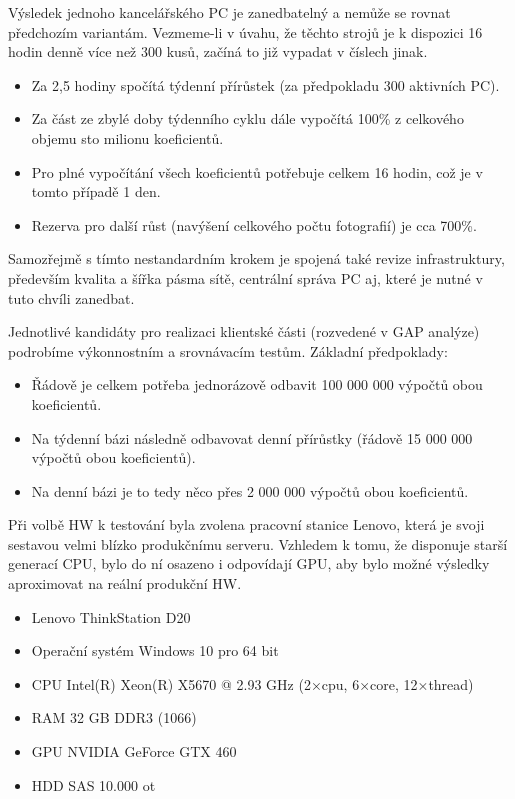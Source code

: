 Výsledek jednoho kancelářského PC je zanedbatelný a nemůže se rovnat předchozím variantám. Vezmeme-li v úvahu, že těchto strojů je k dispozici 16 hodin denně více než 300 kusů, začíná to již vypadat v číslech jinak.

\begin{itemize}
	\setlength{\parskip}{0pt}
	\setlength{\itemsep}{0pt}
	\item {Za 2,5 hodiny spočítá týdenní přírůstek (za předpokladu 300 aktivních PC).}
	\item {Za část ze zbylé doby týdenního cyklu dále vypočítá 100\% z celkového objemu sto milionu koeficientů.}
	\item {Pro plné vypočítání všech koeficientů potřebuje celkem 16 hodin, což je v tomto případě 1 den.}
	\item {Rezerva pro další růst (navýšení celkového počtu fotografií) je cca 700\%.}
\end{itemize}

Samozřejmě s tímto nestandardním krokem je spojená také revize infrastruktury, především kvalita a šířka pásma sítě, centrální správa PC aj, které je nutné v tuto chvíli zanedbat.

Jednotlivé kandidáty pro realizaci klientské části (rozvedené v GAP analýze) podrobíme výkonnostním a srovnávacím testům.
Základní předpoklady:
\begin{itemize}
	\setlength{\parskip}{0pt}
	\setlength{\itemsep}{0pt}
	\item {Řádově je celkem potřeba jednorázově odbavit 100 000 000 výpočtů obou koeficientů.}
	\item {Na týdenní bázi následně odbavovat denní přírůstky (řádově 15 000 000 výpočtů obou koeficientů).}
	\item {Na denní bázi je to tedy něco přes 2 000 000 výpočtů obou koeficientů.}
\end{itemize}



Při volbě HW k testování byla zvolena pracovní stanice Lenovo, která je svoji sestavou velmi blízko produkčnímu serveru. Vzhledem k tomu, že disponuje starší generací CPU, bylo do ní osazeno i odpovídají GPU, aby bylo možné výsledky aproximovat na reální produkční HW.
\begin{itemize}
	\setlength{\parskip}{0pt}
	\setlength{\itemsep}{0pt}
	\item {Lenovo ThinkStation D20}
	\item {Operační systém Windows 10 pro 64 bit}
    \item {CPU Intel(R) Xeon(R) X5670 @ 2.93 GHz (2×cpu, 6×core, 12×thread)}
    \item {RAM 32 GB DDR3 (1066)}
    \item {GPU NVIDIA GeForce GTX 460}
    \item {HDD SAS 10.000 ot}
\end{itemize}

